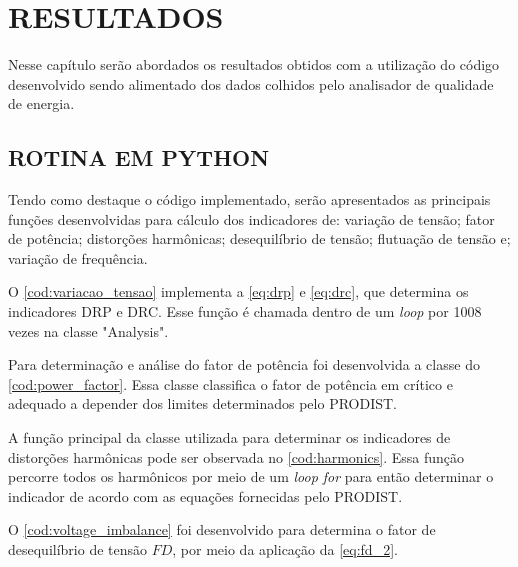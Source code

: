 \chapter{RESULTADOS}

Nesse capítulo serão abordados os resultados obtidos com a utilização do código desenvolvido sendo alimentado dos dados colhidos pelo analisador de qualidade de energia.

\section{ROTINA EM PYTHON}

Tendo como destaque o código implementado, serão apresentados as principais funções desenvolvidas para cálculo dos indicadores de: variação de tensão; fator de potência; distorções harmônicas; desequilíbrio de tensão; flutuação de tensão e; variação de frequência.

O \autoref{cod:variacao_tensao} implementa a \autoref{eq:drp} e \autoref{eq:drc}, que determina os indicadores DRP e DRC. Esse função é chamada dentro de um \textit{loop} por 1008 vezes na classe "Analysis".

\begin{codigo}
\end{codigo}


Para determinação e análise do fator de potência foi desenvolvida a classe do \autoref{cod:power_factor}. Essa classe classifica o fator de potência em crítico e adequado a depender dos limites determinados pelo PRODIST.

\begin{codigo}
\end{codigo}

A função principal da classe utilizada para determinar os indicadores de distorções harmônicas pode ser observada no \autoref{cod:harmonics}. Essa função percorre todos os harmônicos por meio de um \textit{loop for} para então determinar o indicador de acordo com as equações fornecidas pelo PRODIST.

O \autoref{cod:voltage_imbalance} foi desenvolvido para determina o fator de desequilíbrio de tensão $FD$, por meio da aplicação da \autoref{eq:fd_2}.

\begin{codigo}
\end{codigo}

